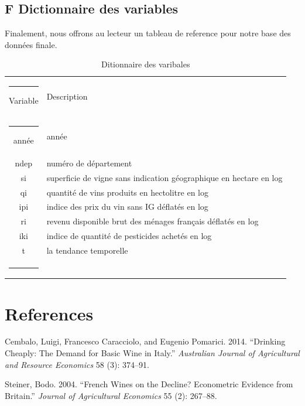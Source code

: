 \documentclass[11pt,]{article}
\begin{document}
\FloatBarrier

\newpage

\hypertarget{f-dictionnaire-des-variables}{%
\subsection{F Dictionnaire des
variables}\label{f-dictionnaire-des-variables}}

Finalement, nous offrons au lecteur un tableau de reference pour notre
base des données finale.

\FloatBarrier

\begin{table}[!htbp]
  \centering
\caption{Ditionnaire des varibales}
\begin{tabular}{c|l}
  \noindent\rule[0.5ex]{\linewidth}{1pt}
  Variable & Description \\
  \noindent\rule[0.5ex]{\linewidth}{1pt}
année & année \\
ndep & numéro de département \\
si & superficie de vigne sans indication géographique en hectare en log \\
qi & quantité de vins produits en hectolitre en log \\
ipi & indice des prix du vin sans IG déflatés en log  \\
ri & revenu disponible brut des ménages français déflatés en log \\
iki & indice de quantité de pesticides achetés en log \\
t & la tendance temporelle \\
\noindent\rule[0.5ex]{\linewidth}{1pt}
\end{tabular}
\end{table}

\FloatBarrier

\newpage

\hypertarget{references}{%
\section*{References}\label{references}}

\hypertarget{refs}{}
\leavevmode\hypertarget{ref-cembalo2014}{}%
Cembalo, Luigi, Francesco Caracciolo, and Eugenio Pomarici. 2014.
``Drinking Cheaply: The Demand for Basic Wine in Italy.''
\emph{Australian Journal of Agricultural and Resource Economics} 58 (3):
374--91.

\leavevmode\hypertarget{ref-steiner2004}{}%
Steiner, Bodo. 2004. ``French Wines on the Decline? Econometric Evidence
from Britain.'' \emph{Journal of Agricultural Economics} 55 (2):
267--88.
\end{document}
